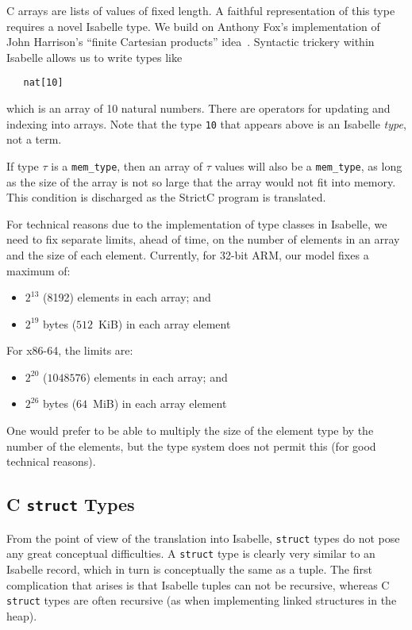 \documentclass{article}
\newcommand{\strictc}{\textsf{StrictC}}
\begin{document}
C arrays are lists of values of fixed length.  A faithful
representation of this type requires a novel Isabelle type.  We build
on Anthony Fox's implementation of John Harrison's ``finite Cartesian
products'' idea~\cite{Harrison:TPHOLs2005:Euclidean-Space}.  Syntactic
trickery within Isabelle allows us to write types like
\begin{verbatim}
   nat[10]
\end{verbatim}
which is an array of 10 natural numbers.  There are operators for
updating and indexing into arrays.  Note that the type \texttt{10}
that appears above is an Isabelle \emph{type}, not a term.

If type $\tau$ is a \texttt{mem_type}, then an array of $\tau$ values
will also be a \texttt{mem_type}, as long as the size of the array is
not so large that the array would not fit into memory.  This condition
is discharged as the \strictc{} program is translated.

For technical reasons due to the implementation of type classes in
Isabelle, we need to fix separate limits, ahead of time, on the
number of elements in an array and the size of each element.
Currently, for 32-bit ARM, our model fixes a maximum of:

\begin{itemize}
\item $2^{13}$ (8192) elements in each array; and
\item $2^{19}$ bytes ($512$~KiB) in each array element
\end{itemize}

For x86-64, the limits are:

\begin{itemize}
\item $2^{20}$ ($1048576$) elements in each array; and
\item $2^{26}$ bytes ($64$~MiB) in each array element
\end{itemize}

One would prefer to be able to multiply the size of the element type by
the number of the elements, but the type system does not permit this
(for good technical reasons).

\subsection{C \texttt{struct} Types}
\label{sec:structs}

From the point of view of the translation into Isabelle,
\texttt{struct} types do not pose any great conceptual difficulties.
A \texttt{struct} type is clearly very similar to an Isabelle record,
which in turn is conceptually the same as a tuple.  The first
complication that arises is that Isabelle tuples can not be recursive,
whereas C \texttt{struct} types are often recursive (as when
implementing linked structures in the heap).
\end{document}
